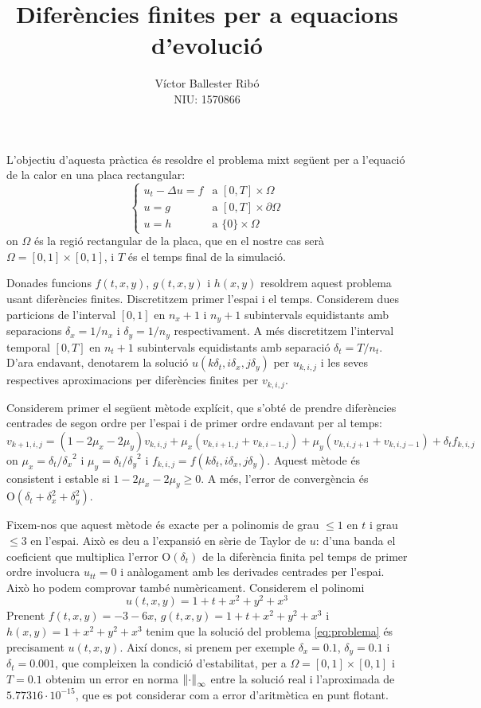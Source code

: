 \documentclass[10pt,a4paper]{article}
\title{\bfseries\Large Diferències finites per a equacions d'evolució}
\author{Víctor Ballester Ribó\\NIU: 1570866}
\date{\parbox{\linewidth}{\centering
  Integració numèrica d'equacions en derivades parcials\endgraf
  Grau en Matemàtiques\endgraf
  Universitat Autònoma de Barcelona\endgraf
  Juny de 2023}}
\renewcommand{\O}[1]{\mathrm{O}\left(#1\right)} %
\theoremstyle{definition}
\theoremstyle{remark}
\begin{document}
\maketitle
L'objectiu d'aquesta pràctica és resoldre el problema mixt següent per a l'equació de la calor en una placa rectangular:
\begin{equation}\label{eq:problema}
  \begin{cases}
    u_t-\Delta u = f & \text{a } [0,T]\times\Omega         \\
    u=g              & \text{a } [0,T]\times\partial\Omega \\
    u=h              & \text{a } \{0\}\times \Omega
  \end{cases}
\end{equation}
on $\Omega$ és la regió rectangular de la placa, que en el nostre cas serà $\Omega = [0,1]\times[0,1]$, i $T$ és el temps final de la simulació.

Donades funcions $f(t,x,y)$, $g(t,x,y)$ i $h(x,y)$ resoldrem aquest problema usant diferències finites. Discretitzem primer l'espai i el temps. Considerem dues particions de l'interval $[0,1]$ en $n_x+1$ i $n_y+1$ subintervals equidistants amb separacions $\delta_x=1/n_x$ i $\delta_y=1/n_y$ respectivament. A més discretitzem l'interval temporal $[0,T]$ en $n_t+1$ subintervals equidistants amb separació $\delta_t=T/n_t$. D'ara endavant, denotarem la solució $u(k\delta_t, i\delta_x, j\delta_y)$ per $u_{k,i,j}$ i les seves respectives aproximacions per diferències finites per $v_{k,i,j}$.

Considerem primer el següent mètode explícit, que s'obté de prendre diferències centrades de segon ordre per l'espai i de primer ordre endavant per al temps:
$$
  v_{k+1,i,j} = (1-2\mu_x - 2\mu_y) v_{k,i,j} + \mu_x (v_{k,i+1,j} + v_{k,i-1,j}) + \mu_y (v_{k,i,j+1} + v_{k,i,j-1}) + \delta_t f_{k,i,j}
$$
on $\mu_x = \delta_t/{\delta_x}^2$ i $\mu_y = \delta_t/{\delta_y}^2$ i $f_{k,i,j}=f(k\delta_t, i\delta_x, j\delta_y)$. Aquest mètode és consistent i estable si $1- 2\mu_x -2 \mu_y \geq 0$. A més, l'error de convergència és $\O{\delta_t + \delta_x^2 + \delta_y^2}$.

Fixem-nos que aquest mètode és exacte per a polinomis de grau $\leq 1$ en $t$ i grau $\leq 3$ en l'espai. Això es deu a l'expansió en sèrie de Taylor de $u$: d'una banda el coeficient que multiplica l'error $\O{\delta_t}$ de la diferència finita pel temps de primer ordre involucra $u_{tt}=0$ i anàlogament amb les derivades centrades per l'espai. Això ho podem comprovar també numèricament. Considerem el polinomi
$$u(t,x,y)=1+t+x^2+y^2+x^3$$
Prenent $f(t,x,y)= -3-6x$, $g(t,x,y)=1+t+x^2+y^2+x^3$ i $h(x,y)=1+x^2+y^2+x^3$ tenim que la solució del problema \eqref{eq:problema} és precisament $u(t,x,y)$. Així doncs, si prenem per exemple $\delta_x=0.1$, $\delta_y=0.1$ i $\delta_t=0.001$, que compleixen la condició d'estabilitat, per a $\Omega = [0,1]\times[0,1]$ i $T=0.1$ obtenim un error en norma $\norm{\cdot}_\infty$ entre la solució real i l'aproximada de $5.77316\cdot 10^{-15}$, que es pot considerar com a error d'aritmètica en punt flotant.\vspace*{0.25cm}
\end{document}
